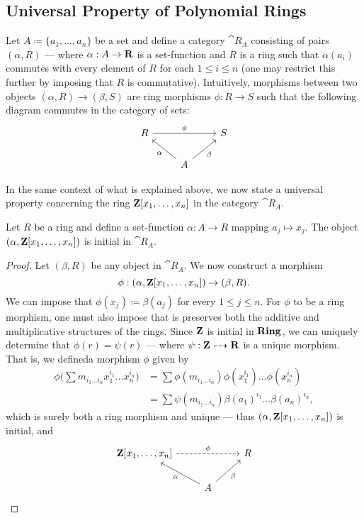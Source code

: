 \subsection{Universal Property of Polynomial Rings}

Let \(A \coloneq \{a_1, \dots, a_n\}\) be a set and define a category
\(\cat R_A\) consisting of pairs \((\alpha, R)\) --- where \(\alpha: A \to \mathbf{R}\)
is a set-function and \(R\) is a ring such that \(\alpha(a_i)\) commutes with
every element of \(R\) for each \(1 \leq i \leq n\) (one may restrict this
further by imposing that \(R\) is commutative). Intuitively, morphisms between
two objects \((\alpha, R) \to (\beta, S)\) are ring morphisms \(\phi: R \to S\)
such that the following diagram commutes in the category of sets:
\[
\begin{tikzcd}
R \ar[rr, "\phi"] & &S \\
&A \ar[lu, "\alpha"] \ar[ru, swap, "\beta"] &
\end{tikzcd}
\]

In the same context of what is explained above, we now state a universal
property concerning the ring \(\mathbf{Z}[x_1, \dots, x_n]\) in the category
\(\cat R_A\).

%
\begin{proposition}
\label{prop:Z[several]-initial-polynomial-rings}
Let \(R\) be a ring and define a set-function \(\alpha: A \to R\) mapping
\(a_j \mapsto x_j\). The object \((\alpha, \mathbf{Z}[x_1, \dots, x_n])\) is initial in
\(\cat R_A\).
\end{proposition}
%

%
\begin{proof}
Let \((\beta, R)\) be any object in \(\cat R_A\). We now construct a morphism
\[
\phi: (\alpha, \mathbf{Z}[x_1, \dots, x_n]) \to (\beta, R).
\]
We can impose that \(\phi(x_j) \coloneq \beta(a_j)\) for every
\(1 \leq j \leq n\). For \(\phi\) to be a ring morphism, one must also impose
that is preserves both the additive and multiplicative structures of the
rings. Since \(\mathbf{Z}\) is initial in \({\textbf{Ring}}\), we can uniquely determine that
\(\phi(r) = \psi(r)\) --- where \(\psi: \mathbf{Z} \dashrightarrow \mathbf{R}\) is a unique
morphism. That is, we defineda morphism \(\phi\) given by
\begin{align*}
  \phi\bigg( \sum m_{i_1 \dots i_n} x_1^{i_1} \dots x_n^{i_n} \bigg)
  &= \sum \phi(m_{i_1 \dots i_n}) \phi(x_1^{i_1}) \dots \phi(x_n^{i_n}) \\
  &= \sum \psi(m_{i_1 \dots i_n}) \beta(a_1)^{i_1} \dots \beta(a_n)^{i_n},
\end{align*}
which is surely both a ring morphism and unique --- thus \((\alpha, \mathbf{Z}[x_1,
\dots, x_n])\) is initial, and
\[
\begin{tikzcd}
\Z[x_1, \dots, x_n] \ar[rr, dashed, "\phi"] & &R \\
&A \ar[lu, "\alpha"] \ar[ru, swap, "\beta"]   &
\end{tikzcd}
\]
\end{proof}
%

